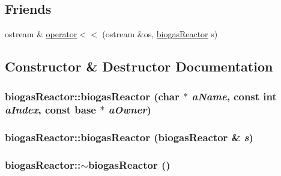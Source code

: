 \subsection*{Friends}
\begin{DoxyCompactItemize}
\item 
ostream \& \hyperlink{classbiogas_reactor_a84f4451be8bd18d8be52ecd0da4337ca}{operator$<$$<$} (ostream \&os, \hyperlink{classbiogas_reactor}{biogasReactor} s)
\end{DoxyCompactItemize}


\subsection{Constructor \& Destructor Documentation}
\hypertarget{classbiogas_reactor_a5e4dd42a6bd6ad49460dd9581bdc599f}{
\subsubsection[{biogasReactor}]{\setlength{\rightskip}{0pt plus 5cm}biogasReactor::biogasReactor (char $\ast$ {\em aName}, \/  const int {\em aIndex}, \/  const {\bf base} $\ast$ {\em aOwner})}}
\label{classbiogas_reactor_a5e4dd42a6bd6ad49460dd9581bdc599f}
\hypertarget{classbiogas_reactor_afdb23c10eef5692834128bfcff11d9f5}{
\subsubsection[{biogasReactor}]{\setlength{\rightskip}{0pt plus 5cm}biogasReactor::biogasReactor ({\bf biogasReactor} \& {\em s})}}
\label{classbiogas_reactor_afdb23c10eef5692834128bfcff11d9f5}
\hypertarget{classbiogas_reactor_abef592b8c00da8bdf44067f049babfc4}{
\subsubsection[{$\sim$biogasReactor}]{\setlength{\rightskip}{0pt plus 5cm}biogasReactor::$\sim$biogasReactor ()}}
\label{classbiogas_reactor_abef592b8c00da8bdf44067f049babfc4}


